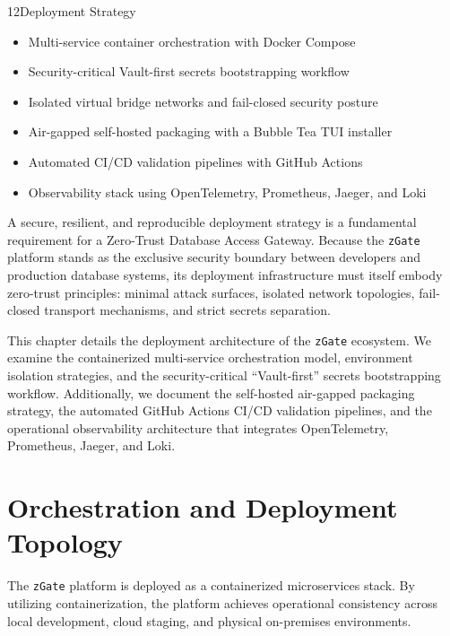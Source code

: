 \begin{sectionintro}{12}{Deployment Strategy}{
  \begin{itemize}[leftmargin=1.5em]
    \item Multi-service container orchestration with Docker Compose
    \item Security-critical Vault-first secrets bootstrapping workflow
    \item Isolated virtual bridge networks and fail-closed security posture
    \item Air-gapped self-hosted packaging with a Bubble Tea TUI installer
    \item Automated CI/CD validation pipelines with GitHub Actions
    \item Observability stack using OpenTelemetry, Prometheus, Jaeger, and Loki
  \end{itemize}
}
A secure, resilient, and reproducible deployment strategy is a fundamental requirement for a Zero-Trust Database Access Gateway. Because the \texttt{zGate} platform stands as the exclusive security boundary between developers and production database systems, its deployment infrastructure must itself embody zero-trust principles: minimal attack surfaces, isolated network topologies, fail-closed transport mechanisms, and strict secrets separation.

This chapter details the deployment architecture of the \texttt{zGate} ecosystem. We examine the containerized multi-service orchestration model, environment isolation strategies, and the security-critical ``Vault-first'' secrets bootstrapping workflow. Additionally, we document the self-hosted air-gapped packaging strategy, the automated GitHub Actions CI/CD validation pipelines, and the operational observability architecture that integrates OpenTelemetry, Prometheus, Jaeger, and Loki.
\end{sectionintro}
\label{ch:deployment_strategy}

\section{Orchestration and Deployment Topology}
The \texttt{zGate} platform is deployed as a containerized microservices stack. By utilizing containerization, the platform achieves operational consistency across local development, cloud staging, and physical on-premises environments.

